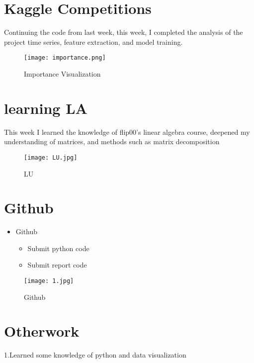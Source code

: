 \section{Kaggle Competitions}\label{sec-intro}
Continuing the code from last week, this week, I completed the analysis of the project time series, feature extraction, and model training.

\begin{figure}[htbp]
	
	\texttt{[image: importance.png]}
	\caption{ Importance Visualization}
\end{figure}







\section{learning LA } \label{sec-conclusions}
This week I learned the knowledge of flip00’s linear algebra course, deepened my understanding of matrices, and methods such as matrix decomposition
\begin{figure}[htbp]

	\texttt{[image: LU.jpg]}
\caption{ LU}
\end{figure}

\section{Github} \label{sec-adanddis}
\begin{itemize}
	\item Github
	\begin{itemize}
		\item Submit python code
		\item Submit report code
	\end{itemize}
\end{itemize}

\begin{figure}[htbp]
	
	\texttt{[image: 1.jpg]}
	\caption{ Github}
\end{figure}
\section{Otherwork}\label{sec-ow}

1.Learned some knowledge of python and data visualization





